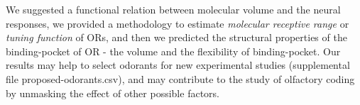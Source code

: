 \documentclass[11pt]{paper} %
\begin{document}
We suggested a functional relation between molecular volume and the neural responses, 
we provided a methodology to estimate {\it molecular receptive range} or {\it tuning function} of ORs,
and then we predicted the structural properties of the binding-pocket of OR - the volume and the flexibility of binding-pocket.
Our results may help to select odorants  for new experimental studies (supplemental file proposed-odorants.csv), 
and may contribute to the study of olfactory coding by unmasking the effect of other possible factors.














 
\end{document}
